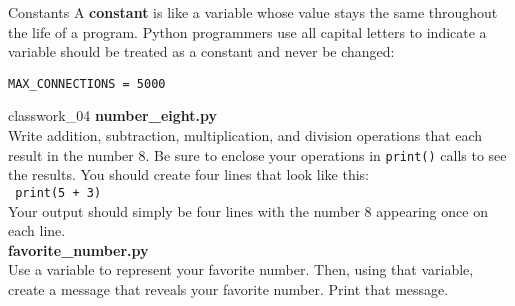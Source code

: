 \documentclass[aspectratio=169]{beamer}
\begin{document}
\begin{frame}[fragile]{Constants}
    A \textbf{constant} is like a variable whose value stays the same throughout the life of a program.
    Python programmers use all capital letters to indicate a variable should be treated as a constant and never be changed:
    \vspace{10pt}
    \begin{verbatim}
MAX_CONNECTIONS = 5000
    \end{verbatim}
\end{frame}


\begin{frame}[fragile]{classwork\_04}
    \textbf{number\_eight.py} \\
    Write addition, subtraction, multiplication, and division operations that each result in the number 8.
    Be sure to enclose your operations in \texttt{print()} calls to see the results.
    You should create four lines that look like this: \\
    \vspace{10pt}
    \texttt{ print(5 + 3)}\\
    \vspace{10pt}
    Your output should simply be four lines with the number 8 appearing once on each line. \\
    \vspace{10pt}
    \textbf{favorite\_number.py} \\
    Use a variable to represent your favorite number.
    Then, using that variable, create a message that reveals your favorite number.
    Print that message.
\end{frame}
\end{document}
